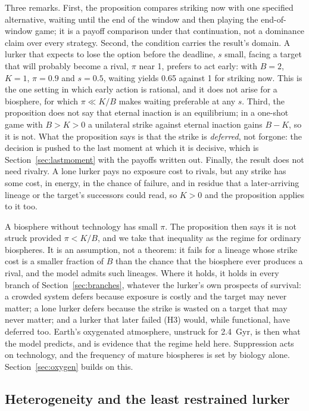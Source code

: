\documentclass[preprint,12pt]{elsarticle}
\theoremstyle{definition}
\begin{document}
Three remarks. First, the proposition compares striking now with one specified alternative, waiting until the end of the window and then playing the end-of-window game; it is a payoff comparison under that continuation, not a dominance claim over every strategy. Second, the condition carries the result's domain. A lurker that expects to lose the option before the deadline, $s$ small, facing a target that will probably become a rival, $\pi$ near 1, prefers to act early: with $B = 2$, $K = 1$, $\pi = 0.9$ and $s = 0.5$, waiting yields 0.65 against 1 for striking now. This is the one setting in which early action is rational, and it does not arise for a biosphere, for which $\pi \ll K/B$ makes waiting preferable at any $s$. Third, the proposition does not say that eternal inaction is an equilibrium; in a one-shot game with $B > K > 0$ a unilateral strike against eternal inaction gains $B - K$, so it is not. What the proposition says is that the strike is \emph{deferred}, not forgone: the decision is pushed to the last moment at which it is decisive, which is Section~\ref{sec:lastmoment} with the payoffs written out. Finally, the result does not need rivalry. A lone lurker pays no exposure cost to rivals, but any strike has some cost, in energy, in the chance of failure, and in residue that a later-arriving lineage or the target's successors could read, so $K > 0$ and the proposition applies to it too.

A biosphere without technology has small $\pi$. The proposition then says it is not struck provided $\pi < K/B$, and we take that inequality as the regime for ordinary biospheres. It is an assumption, not a theorem: it fails for a lineage whose strike cost is a smaller fraction of $B$ than the chance that the biosphere ever produces a rival, and the model admits such lineages. Where it holds, it holds in every branch of Section~\ref{sec:branches}, whatever the lurker's own prospects of survival: a crowded system defers because exposure is costly and the target may never matter; a lone lurker defers because the strike is wasted on a target that may never matter; and a lurker that later failed (H3) would, while functional, have deferred too. Earth's oxygenated atmosphere, unstruck for 2.4~Gyr, is then what the model predicts, and is evidence that the regime held here. Suppression acts on technology, and the frequency of mature biospheres is set by biology alone. Section~\ref{sec:oxygen} builds on this.

\subsection{Heterogeneity and the least restrained lurker}
\label{sec:hetero}
\end{document}
